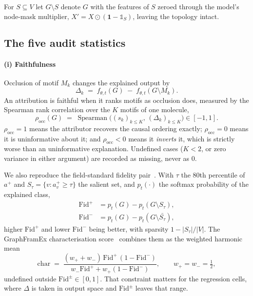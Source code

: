 For $S\subseteq V$ let $G\!\setminus\!S$ denote $G$ with the features of $S$
zeroed through the model's node-mask multiplier,
$X' = X\odot(\mathbf{1}-\mathbb{1}_S)$, leaving the topology intact.

\subsection{The five audit statistics}

\paragraph{(i) Faithfulness} Occlusion of motif $M_k$ changes the explained
output by
\begin{equation}
  \Delta_k \;=\; f_{\theta,t}(G)\;-\;f_{\theta,t}(G\!\setminus\! M_k).
  \label{eq:occ}
\end{equation}
An attribution is faithful when it ranks motifs as occlusion does, measured by
the Spearman rank correlation over the $K$ motifs of one molecule,
\begin{equation}
  \rho_{\mathrm{occ}}(G) \;=\; \operatorname{Spearman}\!\big(
    (s_k)_{k\le K},\,(\Delta_k)_{k\le K}\big) \in[-1,1].
  \label{eq:rhoocc}
\end{equation}
$\rho_{\mathrm{occ}}=1$ means the attributor recovers the causal ordering
exactly; $\rho_{\mathrm{occ}}=0$ means it is uninformative about it; and
$\rho_{\mathrm{occ}}<0$ means it \emph{inverts} it, which is strictly worse
than an uninformative explanation. Undefined cases ($K<2$, or zero variance in
either argument) are recorded as missing, never as $0$.

We also reproduce the field-standard fidelity pair~\cite{gnnsurvey}. With
$\tau$ the $80$th percentile of $a^+$ and $S_\tau=\{v: a^+_v\ge\tau\}$ the
salient set, and $p_t(\cdot)$ the softmax probability of the explained class,
\begin{align}
  \mathrm{Fid}^{+} &= p_t(G) - p_t(G\!\setminus\!S_\tau), \label{eq:fidplus}\\
  \mathrm{Fid}^{-} &= p_t(G) - p_t(G\!\setminus\!\bar{S_\tau}), \label{eq:fidminus}
\end{align}
higher $\mathrm{Fid}^{+}$ and lower $\mathrm{Fid}^{-}$ being better, with
sparsity $1-|S_\tau|/|V|$. The GraphFramEx characterisation
score~\cite{graphframex} combines them as the weighted harmonic mean
\begin{equation}
  \mathrm{char} \;=\;
  \frac{(w_{+}+w_{-})\,\mathrm{Fid}^{+}\,(1-\mathrm{Fid}^{-})}
       {w_{-}\mathrm{Fid}^{+} + w_{+}(1-\mathrm{Fid}^{-})},
  \qquad w_{+}=w_{-}=\tfrac12 ,
  \label{eq:char}
\end{equation}
undefined outside $\mathrm{Fid}^{\pm}\in[0,1]$. That constraint matters for
the regression cells, where $\Delta$ is taken in output space and
$\mathrm{Fid}^{\pm}$ leaves that range.


